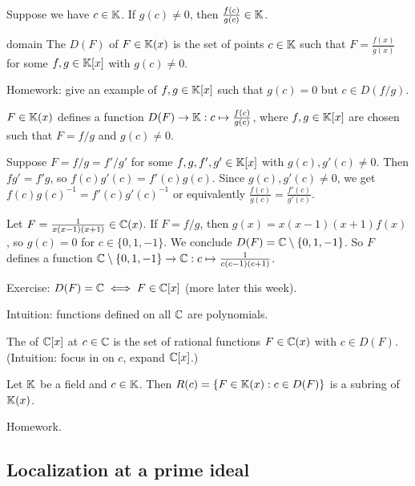 \documentclass[12pt,letterpaper]{report}
\begin{document}
Suppose we have $c \in \mathbb{K}$.
If $g(c) \neq 0$, then $\frac{f(c)}{g(c)} \in \mathbb{K}$.

\begin{defn}{domain}{}
  The  $D(F)$ of $F \in \mathbb{K}(x)$ is the set of points $c \in \mathbb{K}$ such that
  $F = \frac{f(x)}{g(x)}$ for some $f, g \in \mathbb{K}[x]$ with $g(c) \neq 0$.
\end{defn}

Homework: give an example of $f, g \in \mathbb{K}[x]$ such that $g(c) = 0$ but $c \in D(f/g)$.

\begin{lem}{}{}
  $F \in \mathbb{K}(x)$ defines a function $D(F) \to \mathbb{K} : c \mapsto \frac{f(c)}{g(c)}$, where
  $f, g \in \mathbb{K}[x]$ are chosen such that $F = f/g$ and $g(c) \neq 0$.
\end{lem}

\begin{thmproof}
  Suppose $F = f/g = f'/g'$ for some $f, g, f', g' \in \mathbb{K}[x]$ with $g(c), g'(c) \neq 0$.
  Then $fg' = f'g$, so $f(c)g'(c) = f'(c)g(c)$.
  Since $g(c), g'(c) \neq 0$, we get $f(c)g(c)^{-1} = f'(c)g'(c)^{-1}$ or equivalently
  $\frac{f(c)}{g(c)} = \frac{f'(c)}{g'(c)}$.
\end{thmproof}

\begin{ex}
  Let $F = \frac{1}{x(x - 1)(x + 1)} \in \mathbb{C}(x)$.
  If $F = f/g$, then $g(x) = x(x - 1)(x + 1)f(x)$, so $g(c) = 0$ for $c \in \{0, 1, -1\}$.
  We conclude $D(F) = \mathbb{C} \setminus \{0, 1, -1\}$.
  So $F$ defines a function
  $\mathbb{C} \setminus \{0, 1, -1\} \to \mathbb{C} : c \mapsto \frac{1}{c(c - 1)(c + 1)}$.

  Exercise: $D(F) = \mathbb{C} \iff F \in \mathbb{C}[x]$ (more later this week).

  Intuition: functions defined on all $\mathbb{C}$ are polynomials.

  The  of $\mathbb{C}[x]$ at $c \in \mathbb{C}$ is the set of rational functions $F \in \mathbb{C}(x)$
  with $c \in D(F)$.
  (Intuition: focus in on $c$, expand $\mathbb{C}[x]$.)
\end{ex}

\begin{lem}{}{}
  Let $\mathbb{K}$ be a field and $c \in \mathbb{K}$.
  Then $R(c) = \{F \in \mathbb{K}(x) : c \in D(F)\}$ is a subring of $\mathbb{K}(x)$.
\end{lem}

\begin{thmproof}
  Homework.
\end{thmproof}

\pagebreak
\subsection{Localization at a prime ideal}
\end{document}
